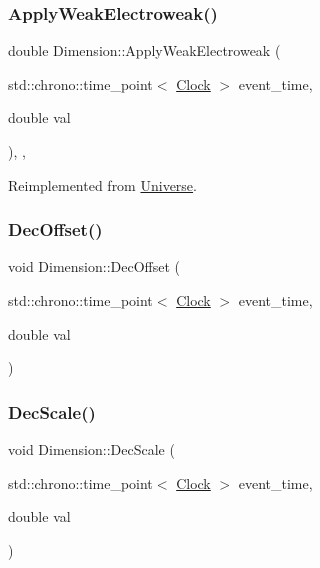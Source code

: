 \subsubsection{\texorpdfstring{Apply\+Weak\+Electroweak()}{ApplyWeakElectroweak()}}
{\footnotesize\ttfamily double Dimension\+::\+Apply\+Weak\+Electroweak (\begin{DoxyParamCaption}\item[{std\+::chrono\+::time\+\_\+point$<$ \mbox{\hyperlink{universe_8h_a0ef8d951d1ca5ab3cfaf7ab4c7a6fd80}{Clock}} $>$}]{event\+\_\+time,  }\item[{double}]{val }\end{DoxyParamCaption})\hspace{0.3cm}{\ttfamily [inline]}, {\ttfamily [final]}, {\ttfamily [virtual]}}



Reimplemented from \mbox{\hyperlink{classUniverse_a46a906baabb63e5d31f8b48ea1fae52e}{Universe}}.

\mbox{\label{classDimension_a2017e62d4b3caf31f4f1b6b5cf59a798}} 
\subsubsection{\texorpdfstring{Dec\+Offset()}{DecOffset()}}
{\footnotesize\ttfamily void Dimension\+::\+Dec\+Offset (\begin{DoxyParamCaption}\item[{std\+::chrono\+::time\+\_\+point$<$ \mbox{\hyperlink{universe_8h_a0ef8d951d1ca5ab3cfaf7ab4c7a6fd80}{Clock}} $>$}]{event\+\_\+time,  }\item[{double}]{val }\end{DoxyParamCaption})}

\mbox{\label{classDimension_a4bd8e584c3bb68ebd7ca0463f8905813}} 
\subsubsection{\texorpdfstring{Dec\+Scale()}{DecScale()}}
{\footnotesize\ttfamily void Dimension\+::\+Dec\+Scale (\begin{DoxyParamCaption}\item[{std\+::chrono\+::time\+\_\+point$<$ \mbox{\hyperlink{universe_8h_a0ef8d951d1ca5ab3cfaf7ab4c7a6fd80}{Clock}} $>$}]{event\+\_\+time,  }\item[{double}]{val }\end{DoxyParamCaption})}

